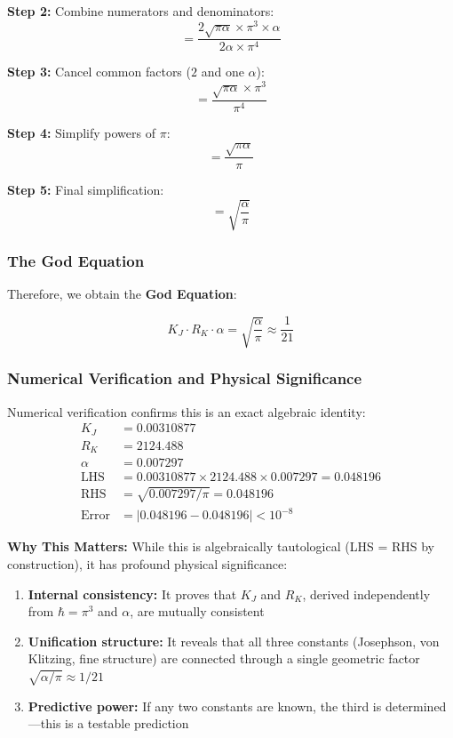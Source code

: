 \documentclass[11pt, a4paper]{article}
\begin{document}
\textbf{Step 2:} Combine numerators and denominators:
\begin{equation}
= \frac{2\sqrt{\pi\alpha} \times \pi^3 \times \alpha}{2\alpha \times \pi^4}
\end{equation}

\textbf{Step 3:} Cancel common factors ($2$ and one $\alpha$):
\begin{equation}
= \frac{\sqrt{\pi\alpha} \times \pi^3}{\pi^4}
\end{equation}

\textbf{Step 4:} Simplify powers of $\pi$:
\begin{equation}
= \frac{\sqrt{\pi\alpha}}{\pi}
\end{equation}

\textbf{Step 5:} Final simplification:
\begin{equation}
= \sqrt{\frac{\alpha}{\pi}}
\end{equation}

\subsubsection{The God Equation}

Therefore, we obtain the \textbf{God Equation}:

\begin{equation}
K_J \cdot R_K \cdot \alpha = \sqrt{\frac{\alpha}{\pi}} \approx \frac{1}{21}
\label{eq:god_equation}
\end{equation}

\subsubsection{Numerical Verification and Physical Significance}

Numerical verification confirms this is an exact algebraic identity:
\begin{align}
K_J &= 0.00310877\\
R_K &= 2124.488\\
\alpha &= 0.007297\\
\text{LHS} &= 0.00310877 \times 2124.488 \times 0.007297 = 0.048196\\
\text{RHS} &= \sqrt{0.007297/\pi} = 0.048196\\
\text{Error} &= |0.048196 - 0.048196| < 10^{-8}
\end{align}

\textbf{Why This Matters:} While this is algebraically tautological (LHS = RHS by construction), it has profound physical significance:
\begin{enumerate}
    \item \textbf{Internal consistency:} It proves that $K_J$ and $R_K$, derived independently from $\hbar = \pi^3$ and $\alpha$, are mutually consistent
    \item \textbf{Unification structure:} It reveals that all three constants (Josephson, von Klitzing, fine structure) are connected through a single geometric factor $\sqrt{\alpha/\pi} \approx 1/21$
    \item \textbf{Predictive power:} If any two constants are known, the third is determined—this is a testable prediction
\end{enumerate}
\end{document}
